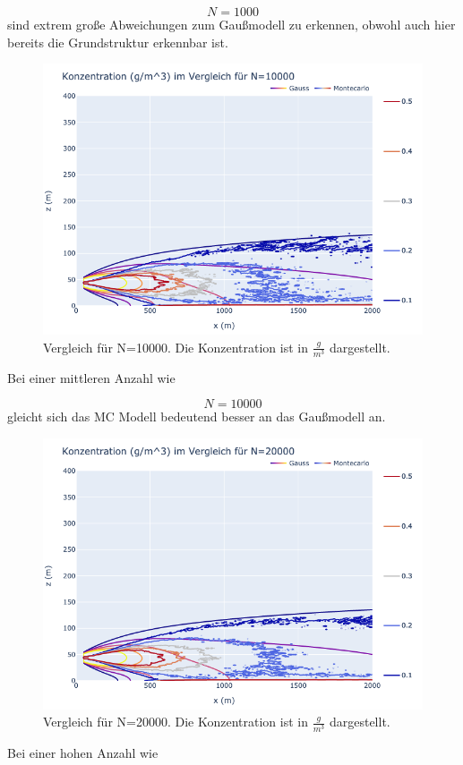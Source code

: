 \documentclass[ngerman]{scrartcl}
\begin{document}
\begin{equation}
	N=1000
\end{equation}
sind extrem große Abweichungen zum Gaußmodell zu erkennen, obwohl auch hier bereits die Grundstruktur erkennbar ist.
\begin{figure}[H]
	\centering
	\includegraphics[scale=0.5]{Bilder/1b10k.png}
	\caption{Vergleich für N=10000. Die Konzentration ist in $\frac{\si{g}}{\si{m^3}}$ dargestellt.}
	\label{fig:my_label}
\end{figure}
Bei einer mittleren Anzahl wie 

\begin{equation}
	N=10000
\end{equation}
gleicht sich das MC Modell bedeutend besser an das Gaußmodell an.
\begin{figure}[H]
	\centering
	\includegraphics[scale=0.5]{Bilder/1b20k.png}
	\caption{Vergleich für N=20000. Die Konzentration ist in $\frac{\si{g}}{\si{m^3}}$ dargestellt.}
	\label{fig:my_label}
\end{figure}
Bei einer hohen Anzahl wie 
\end{document}

